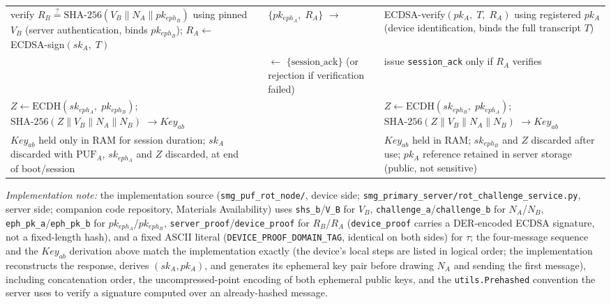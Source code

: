 \documentclass[preprint,12pt,authoryear]{elsarticle}
\begin{document}
\begin{longtable}{
    >{\centering\arraybackslash}p{3.8cm}
    c
    >{\centering\arraybackslash}p{4.2cm}
    c
    >{\centering\arraybackslash}p{3.8cm}
}
        verify $R_B \stackrel{?}{=} \text{SHA-256}(V_B \!\parallel\! N_A \!\parallel\! pk_{eph_B})$ using pinned $V_B$ (server authentication, binds $pk_{eph_B}$); $R_A \leftarrow$ ECDSA-sign$(sk_A,\;T)$ & & $\{pk_{eph_A},\;R_A\}$ ${\rightarrow}$ & & ECDSA-verify$(pk_A,\;T,\;R_A)$ using registered $pk_A$ (device identification, binds the full transcript $T$) \\
        & & ${\leftarrow}$ $\{\text{session\_ack}\}$ (or rejection if verification failed) & & issue \texttt{session\_ack} only if $R_A$ verifies \\
        $Z \leftarrow \text{ECDH}(sk_{eph_A},\;pk_{eph_B})$; $\text{SHA-256}(Z \!\parallel\! V_B \!\parallel\! N_A \!\parallel\! N_B)$ ${\rightarrow Key_{ab}}$ & & & & $Z \leftarrow \text{ECDH}(sk_{eph_B},\;pk_{eph_A})$; $\text{SHA-256}(Z \!\parallel\! V_B \!\parallel\! N_A \!\parallel\! N_B)$ ${\rightarrow Key_{ab}}$ \\
        $Key_{ab}$ held only in RAM for session duration; $sk_A$ discarded with $\text{PUF}_A$, $sk_{eph_A}$ and $Z$ discarded, at end of boot/session & & & & $Key_{ab}$ held in RAM; $sk_{eph_B}$ and $Z$ discarded after use; $pk_A$ reference retained in server storage (public, not sensitive) \\
\end{longtable}
\endgroup
\begin{sloppypar}
\noindent\textit{Implementation note:} the implementation source (\texttt{smg\_puf\_rot\_node/}, device side; \texttt{smg\_primary\_server/rot\_challenge\_service.py}, server side; companion code repository, Materials Availability) uses \texttt{shs\_b}/\texttt{V\_B} for $V_B$, \texttt{challenge\_a}/\texttt{challenge\_b} for $N_A$/$N_B$, \texttt{eph\_pk\_a}/\texttt{eph\_pk\_b} for $pk_{eph_A}$/$pk_{eph_B}$, \texttt{server\_proof}/\texttt{device\_proof} for $R_B$/$R_A$ (\texttt{device\_proof} carries a DER-encoded ECDSA signature, not a fixed-length hash), and a fixed ASCII literal (\texttt{DEVICE\_PROOF\_DOMAIN\_TAG}, identical on both sides) for $\tau$; the four-message sequence and the $Key_{ab}$ derivation above match the implementation exactly (the device's local steps are listed in logical order; the implementation reconstructs the response, derives $(sk_A, pk_A)$, and generates its ephemeral key pair before drawing $N_A$ and sending the first message), including concatenation order, the uncompressed-point encoding of both ephemeral public keys, and the \texttt{utils.Prehashed} convention the server uses to verify a signature computed over an already-hashed message.
\end{sloppypar}
\end{document}
